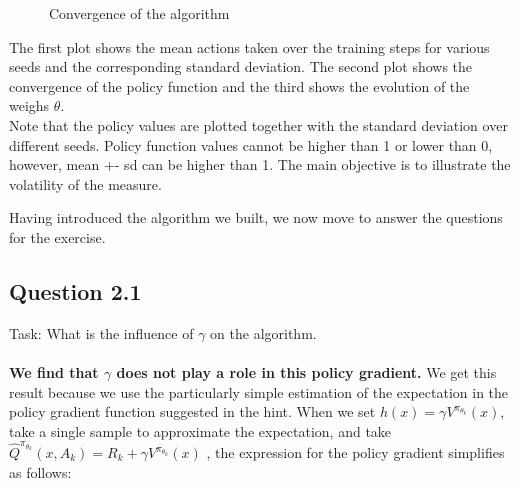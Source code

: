 \documentclass[a4paper, 11pt]{article} %
\begin{document}
   \begin{figure}[!htb]
        \caption{\label{fig:my-label} Convergence of the algorithm}
      \end{figure}

The first plot shows the mean actions taken over the training steps for various seeds and the corresponding standard deviation. The second plot shows the convergence of the policy function and the third shows the evolution of the weighs $\theta$. \\

Note that the policy values are plotted together with the standard deviation over different seeds. Policy function values cannot be higher than 1 or lower than 0, however, mean +- sd can be higher than 1. The main objective is to illustrate the volatility of the measure.

Having introduced the algorithm we built, we now move to answer the questions for the exercise.

\subsection*{Question 2.1}

Task: What is the influence of $\gamma$ on the algorithm.
\\
\\
\textbf{We find that $\gamma$ does not play a role in this policy gradient.} We get this result because we use the particularly simple estimation of the expectation in the policy gradient function suggested in the hint. When we set $h(x)=\gamma V^{\pi_{\theta_{k}}}(x)$, take a single sample to approximate the expectation, and take $\widehat{Q}^{\pi_{\theta_{k}}}\left(x, A_{k}\right)=R_{k}+\gamma V^{\pi_{\theta_{k}}}(x)$ , the expression for the policy gradient simplifies as follows:
\end{document}
